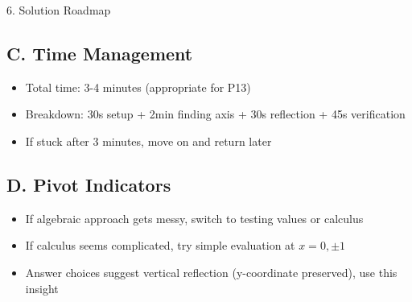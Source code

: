 \documentclass[12pt]{article}
\begin{document}
\begin{roadmapbox}{6. Solution Roadmap}
\subsection*{C. Time Management}
\begin{itemize}[leftmargin=*]
    \item Total time: 3-4 minutes (appropriate for P13)
    \item Breakdown: 30s setup + 2min finding axis + 30s reflection + 45s verification
    \item If stuck after 3 minutes, move on and return later
\end{itemize}

\subsection*{D. Pivot Indicators}
\begin{itemize}[leftmargin=*]
    \item If algebraic approach gets messy, switch to testing values or calculus
    \item If calculus seems complicated, try simple evaluation at $x = 0, \pm 1$
    \item Answer choices suggest vertical reflection (y-coordinate preserved), use this insight
\end{itemize}

\end{roadmapbox}
\end{document}
